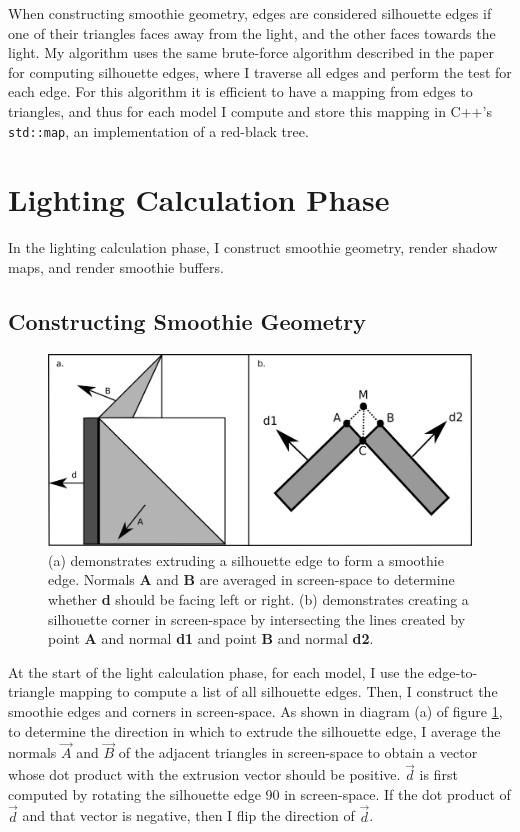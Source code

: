 \documentclass[sigconf]{acmart}
\begin{document}
When constructing smoothie geometry, edges are considered silhouette edges if one of their triangles faces away from the light, and the other faces towards the light. My algorithm uses the same brute-force algorithm described in the paper for computing silhouette edges, where I traverse all edges and perform the test for each edge. For this algorithm it is efficient to have a mapping from edges to triangles, and thus for each model I compute and store this mapping in C++'s \texttt{std::map}, an implementation of a red-black tree.

\section{Lighting Calculation Phase}

In the lighting calculation phase, I construct smoothie geometry, render shadow maps, and render smoothie buffers.

\subsection{Constructing Smoothie Geometry}

\begin{figure}[t]
    \includegraphics[width=\linewidth]{reportfiles/smoothie-construction}
    \caption{(a) demonstrates extruding a silhouette edge to form a smoothie edge. Normals \textbf{A} and \textbf{B} are averaged in screen-space to determine whether \textbf{d} should be facing left or right. (b) demonstrates creating a silhouette corner in screen-space by intersecting the lines created by point \textbf{A} and normal \textbf{d1} and point \textbf{B} and normal \textbf{d2}.}
    \label{fig:smoothie-construction}
\end{figure}

At the start of the light calculation phase, for each model, I use the edge-to-triangle mapping to compute a list of all silhouette edges. Then, I construct the smoothie edges and corners in screen-space. As shown in diagram (a) of figure \ref{fig:smoothie-construction}, to determine the direction in which to extrude the silhouette edge, I average the normals $\vec{A}$ and $\vec{B}$ of the adjacent triangles in screen-space to obtain a vector whose dot product with the extrusion vector should be positive. $\vec{d}$ is first computed by rotating the silhouette edge {90\textdegree} in screen-space. If the dot product of $\vec{d}$ and that vector is negative, then I flip the direction of $\vec{d}$.
\end{document}
